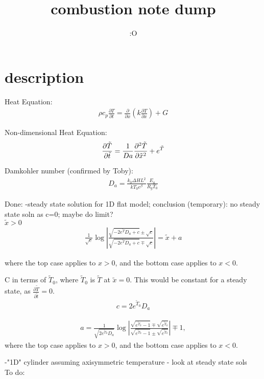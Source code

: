 \documentclass[12pt]{article}
\title{combustion note dump}
\author{:O}
\begin{document}
\maketitle
\section{description}

Heat Equation:
\begin{align} \label{Heat Equation}
    \rho c_p \frac{\partial T}{\partial t} = \frac{\partial}{\partial x} \left(k \frac{\partial T}{\partial x}\right) + G
\end{align}

Non-dimensional Heat Equation:
\begin{equation} \label{Non-dimensional heat equation}
    \frac{\partial \Tilde{T}}{\partial \Tilde{t}} = \frac{1}{Da}\frac{\partial^2 \Tilde{T}}{\partial \Tilde{x}^2} + e^{\Tilde{T}}
\end{equation}

Damkohler number (confirmed by Toby):
\begin{align} \label{Damkohler Number}
    D_a = \frac{k_0 \Delta H L^2}{kT_0 e^{\beta}} \frac{E_a}{R_gT_0} 
\end{align}


Done:
-steady state solution for 1D flat model; conclusion (temporary): no steady state soln as c=0; maybe do limit? \\

$\tilde{x} > 0$
\begin{align} \label{Steady State Solution}
    \frac{1}{\sqrt{c}} \log\left| \frac{\sqrt{-2e^{\tilde{T}}D_a +c}\pm\sqrt{c}}{\sqrt{-2e^{\tilde{T}}D_a +c}\mp\sqrt{c}} \right| = \tilde{x} + a
\end{align}

where the top case applies to $x>0$, and the bottom case applies to $x<0$.


C in terms of $\tilde{T}_0$, where $\tilde{T}_0$ is $\tilde{T}$ at $\tilde{x} = 0$. This would be constant for a steady state, as $\frac{\partial \tilde{T}}{\partial \tilde{t}} = 0$.
\begin{align}
    c = 2e^{\tilde{T}_0}D_a
\end{align}

\begin{align}
    a = \frac{1}{\sqrt{2e^{\tilde{T}_0}D_a}} \log\left| \frac{\sqrt{e^{\tilde{T}_0}-1} \mp \sqrt{e^{\tilde{T}_0}}}{\sqrt{e^{\tilde{T}_0}-1} \pm \sqrt{e^{\tilde{T}_0}}} \right| \mp 1,
\end{align}
where the top case applies to $x>0$, and the bottom case applies to $x<0$.

-"1D" cylinder assuming axisymmetric temperature - look at steady state sols\\


To do:
\end{document}
